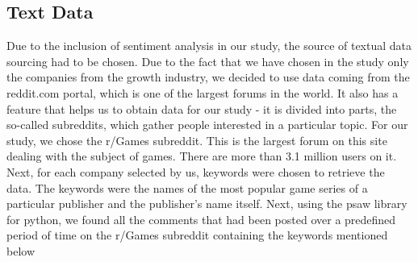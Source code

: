 \documentclass[11pt]{article} %
\begin{document}
\clearpage

\subsection{Text Data}
Due to the inclusion of sentiment analysis in our study, the source of textual data sourcing had to be chosen. Due to the fact that we have chosen in the study only the companies from the growth industry, we decided to use data coming from the reddit.com portal, which is one of the largest forums in the world. It also has a feature that helps us to obtain data for our study - it is divided into parts, the so-called subreddits, which gather people interested in a particular topic. For our study, we chose the r/Games subreddit. This is the largest forum on this site dealing with the subject of games. There are more than 3.1 million users on it. Next, for each company selected by us, keywords were chosen to retrieve the data. The keywords were the names of the most popular game series of a particular publisher and the publisher's name itself. Next, using the psaw library for python, we found all the comments that had been posted over a predefined period of time on the r/Games subreddit containing the keywords mentioned below 
\end{document}
